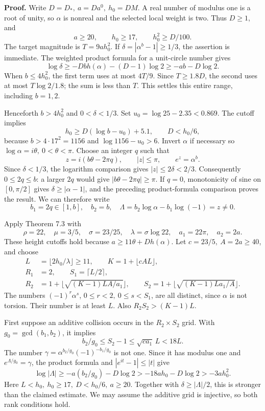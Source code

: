 \documentclass[
  11pt,
  a4paper,
]{article}
\begin{document}
\textbf{Proof.} Write \(D=D_*,\ a=Da^0,\ h_0=DM\). A real number of
modulus one is a root of unity, so \(\alpha\) is nonreal and the
selected local weight is two. Thus \(D\ge1\), and \[
a\ge20,\qquad h_0\ge17,\qquad h_0^2\ge D/100.
\] The target magnitude is \(T=9ah_0^2\). If
\(\delta=|\alpha^b-1|\ge1/3\), the assertion is immediate. The weighted
product formula for a unit-circle number gives \[
\log\delta\ge-Dbh(\alpha)-(D-1)\log2\ge-ab-D\log2.
\] When \(b\le4h_0^2\), the first term uses at most \(4T/9\). Since
\(T\ge1.8D\), the second uses at most \(T\log2/1.8\); the sum is less
than \(T\). This settles this entire range, including \(b=1,2\).

Henceforth \(b>4h_0^2\) and \(0<\delta<1/3\). Set
\(u_0=\log25-2.35<0.869\). The cutoff implies \[
h_0\ge D(\log b-u_0)+5.1,\qquad D<h_0/6,
\] because \(b>4\cdot17^2=1156\) and \(\log1156-u_0>6\). Invert
\(\alpha\) if necessary so \(\log\alpha=i\theta,\ 0<\theta<\pi\). Choose
an integer \(q\) such that \[
z=i(b\theta-2\pi q),\qquad |z|\le\pi,\qquad e^z=\alpha^b.
\] Since \(\delta<1/3\), the logarithm comparison gives
\(|z|\le2\delta<2/3\). Consequently \(0\le2q\le b\): a larger \(2q\)
would give \(|b\theta-2\pi q|\ge\pi\). If \(q=0\), monotonicity of sine
on \([0,\pi/2]\) gives \(\delta\ge|\alpha-1|\), and the preceding
product-formula comparison proves the result. We can therefore write \[
b_1=2q\in[1,b],\quad b_2=b,\quad
\Lambda=b_2\log\alpha-b_1\log(-1)=z\ne0.
\]

Apply Theorem 7.3 with \[
\rho=22,\quad\mu=3/5,\quad\sigma=23/25,\quad
\lambda=\sigma\log22,\quad a_1=22\pi,\quad a_2=2a.
\] These height cutoffs hold because \(a\ge11\theta+Dh(\alpha)\). Let
\(c=23/5,\ A=2a\ge40\), and choose \[
\begin{aligned}
L&=\lfloor2h_0/\lambda\rfloor\ge11,\qquad
K=1+\lfloor cAL\rfloor,\\
R_1&=2,\qquad S_1=\lceil L/2\rceil,\\
R_2&=1+\lfloor\sqrt{(K-1)LA/a_1}\rfloor,\qquad
S_2=1+\lfloor\sqrt{(K-1)La_1/A}\rfloor.
\end{aligned}
\] The numbers \((-1)^r\alpha^s\), \(0\le r<2,\ 0\le s<S_1\), are all
distinct, since \(\alpha\) is not torsion. Their number is at least
\(L\). Also \(R_2S_2>(K-1)L\).

First suppose an additive collision occurs in the \(R_2\times S_2\)
grid. With \(g_0=\gcd(b_1,b_2)\), it implies \[
b_2/g_0\le S_2-1
\le\sqrt{ca_1}\,L<18L.
\] The number \(\gamma=\alpha^{b_2/g_0}(-1)^{-b_1/g_0}\) is not one.
Since it has modulus one and \(e^{\Lambda/g_0}=\gamma\), the product
formula and \(|e^{it}-1|\le|t|\) give \[
\log|\Lambda|\ge-a(b_2/g_0)-D\log2
>-18ah_0-D\log2>-3ah_0^2.
\] Here \(L<h_0,\ h_0\ge17,\ D<h_0/6,\ a\ge20\). Together with
\(\delta\ge|\Lambda|/2\), this is stronger than the claimed estimate. We
may assume the additive grid is injective, so both rank conditions hold.
\end{document}
